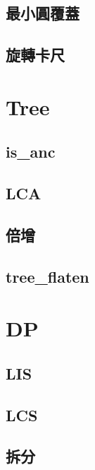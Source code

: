 \documentclass[a4paper,10pt,twocolumn,oneside]{article}
\begin{document}
    \subsection{最小圓覆蓋}
    
    
    \subsection{旋轉卡尺}
    
    

\section{Tree}

    \subsection{is\_anc}
    

    \subsection{LCA}
    

    \subsection{倍增}
    

    \subsection{tree\_flaten}
    


\section{DP}
    \subsection{LIS}
    

    \subsection{LCS}
    

    \subsection{拆分}
    
\end{document}
